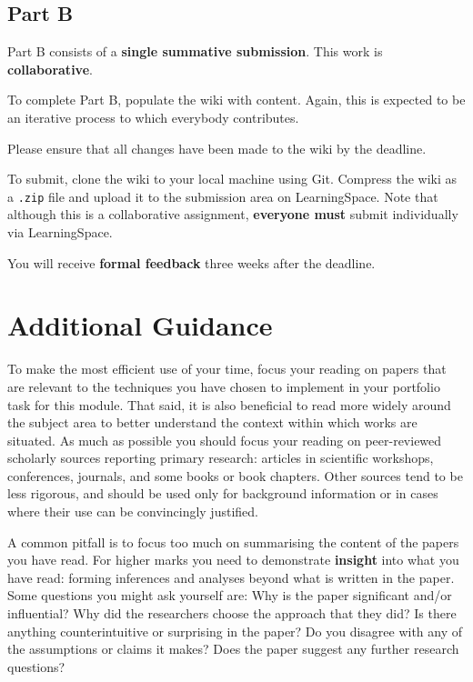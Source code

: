 \documentclass{../../fal_assignment}
\begin{document}
\subsection*{Part B}

Part B consists of a \textbf{single summative submission}. This work is \textbf{collaborative}.

To complete Part B, populate the wiki with content.
Again, this is expected to be an iterative process to which everybody contributes.

Please ensure that all changes have been made to the wiki by the deadline.

To submit, clone the wiki to your local machine using Git.
Compress the wiki as a \texttt{.zip} file and upload it to the submission area on LearningSpace.
Note that although this is a collaborative assignment,
\textbf{everyone must} submit individually via LearningSpace.

You will receive \textbf{formal feedback} three weeks after the deadline.

\section*{Additional Guidance}

To make the most efficient use of your time,
focus your reading on papers that are relevant to the techniques you have chosen to implement
in your portfolio task for this module.
That said, it is also beneficial to read more widely around the subject area
to better understand the context within which works are situated.
As much as possible you should focus your reading on peer-reviewed scholarly sources reporting primary research:
articles in scientific workshops, conferences, journals, and some books or book chapters.
Other sources tend to be less rigorous, and should be used only for background information
or in cases where their use can be convincingly justified.

A common pitfall is to focus too much on summarising the content of the papers you have read.
For higher marks you need to demonstrate \textbf{insight} into what you have read:
forming inferences and analyses beyond what is written in the paper.
Some questions you might ask yourself are:
Why is the paper significant and/or influential?
Why did the researchers choose the approach that they did?
Is there anything counterintuitive or surprising in the paper?
Do you disagree with any of the assumptions or claims it makes?
Does the paper suggest any further research questions?
\end{document}
